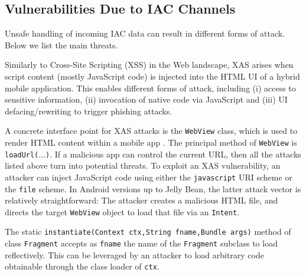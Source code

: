 
\subsection{Vulnerabilities Due to IAC Channels}\label{Se:attackSurface}

Unsafe handling of incoming IAC data can result in different forms of attack. Below we list the main threats.

 Similarly to Cross-Site Scripting (XSS) in the Web landscape, XAS arises when script content (mostly JavaScript code) is injected into the HTML UI of a hybrid mobile application. This enables different forms of attack, including (i) access to sensitive information, (ii) invocation of native code via JavaScript and (iii) UI defacing/rewriting to trigger phishing attacks.

A concrete interface point for XAS attacks is the {\tt WebView} class, which is used to render HTML content within a mobile app \cite{LHDWY:ACSAC11}. The principal method of {\tt WebView} is {\tt loadUrl($\ldots$)}. If a malicious app can control the current URL, then all the attacks listed above turn into potential threats. 
%
To exploit an XAS vulnerability, an attacker can inject JavaScript code using either the {\tt javascript} URI scheme or the {\tt file} scheme. In Android versions up to Jelly Bean, the latter attack vector is relatively straightforward: The attacker creates a malicious HTML file, and directs the target {\tt WebView} object to load that file via an {\tt Intent}.
%

 The static {\tt instantiate(Context ctx,String fname,Bundle args)} method of class {\tt Fragment} accepts as {\tt fname} the name of the {\tt Fragment} subclass to load reflectively. This can be leveraged by an attacker to load arbitrary code obtainable through the class loader of {\tt ctx}. 

